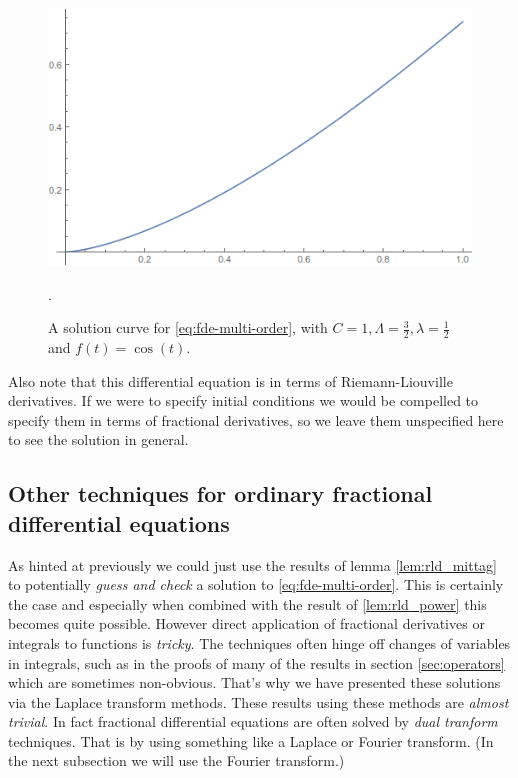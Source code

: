\begin{figure}[H]
    \includegraphics[scale=0.7]{images/Mittag-Leffler-Solution-2}
    \caption{A solution curve for \eqref{eq:fde-multi-order}, with $ C = 1, \Lambda = \frac{3}{2}, \lambda = \frac{1}{2} $ and $ f(t) = \cos(t) $. }.
\end{figure}

Also note that this differential equation is in terms of Riemann-Liouville derivatives. If we were to specify
initial conditions we would be compelled to specify them in terms of fractional derivatives, so we leave them
unspecified here to see the solution in general.




\subsection{Other techniques for ordinary fractional differential equations}

As hinted at previously we could just use the results of lemma \ref{lem:rld_mittag} to potentially \emph{guess and check} a solution to \ref{eq:fde-multi-order}. This is certainly the case and especially when combined with the result of \ref{lem:rld_power} this becomes quite possible. However direct application of fractional derivatives or integrals to functions is \emph{tricky}. The techniques often hinge off changes of variables in integrals, such as in the proofs of many of the results in section \ref{sec:operators} which are sometimes non-obvious. That's why we have presented these solutions via the Laplace transform methods. These results using these methods are \emph{almost trivial}. In fact fractional differential equations are often solved by \emph{dual tranform} techniques. That is by using something like a Laplace or Fourier transform. (In the next subsection we will use the Fourier transform.)

